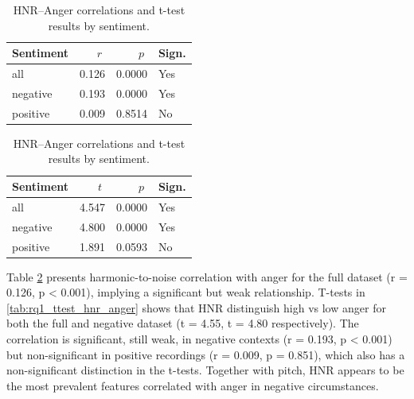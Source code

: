   \begin{table}[H]
    \centering
  
    \begin{subtable}{0.45\textwidth}
      \centering
      \caption{HNR and Anger (r)}\label{tab:rq1_corr_hnr_anger}
      \begin{tabular}{l r r l}
        \toprule
        Sentiment & \(\;r\;\) & \(\;p\;\) & Sign. \\
        \midrule
        all      & 0.126 & 0.0000 & Yes \\
        negative & 0.193 & 0.0000 & Yes \\
        positive & 0.009 & 0.8514 & No  \\
        \bottomrule
      \end{tabular}
    \end{subtable}\hfill
    \begin{subtable}{0.45\textwidth}
      \centering
      \caption{HNR and Anger (t-test)}\label{tab:rq1_ttest_hnr_anger}
      \begin{tabular}{l r r l}
        \toprule
        Sentiment & \(\;t\;\) & \(\;p\;\) & Sign. \\
        \midrule
        all      & 4.547 & 0.0000 & Yes \\
        negative & 4.800 & 0.0000 & Yes \\
        positive & 1.891 & 0.0593 & No  \\
        \bottomrule
      \end{tabular}
    \end{subtable}
  
    \caption{HNR–Anger correlations and t-test results by sentiment.}
    \label{tab:rq1_hnr_anger_side_by_side}
  \end{table}
  
  Table \ref{tab:rq1_hnr_anger_side_by_side} presents harmonic-to-noise correlation with anger for the full dataset (r = 0.126, p < 0.001), implying a significant but weak relationship. 
  T-tests in \ref{tab:rq1_ttest_hnr_anger} shows that HNR distinguish high vs low anger for both the full and negative dataset (t = 4.55, t = 4.80 respectively).
  The correlation is significant, still weak, in negative contexts (r = 0.193, p < 0.001) but non-significant in positive recordings (r = 0.009, p = 0.851), which also has a non-significant distinction in the t-tests.
  Together with pitch, HNR appears to be the most prevalent features correlated with anger in negative circumstances. 
  
